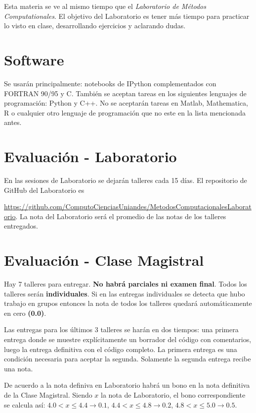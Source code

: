 \documentclass[11pt]{article}
\begin{document}
Esta materia se ve al mismo tiempo que el \emph{Laboratorio de M\'etodos
Computationales}. El objetivo del Laboratorio es tener m\'as tiempo
para practicar lo visto en clase, desarrollando ejercicios y aclarando dudas.

\section*{Software}
\noindent Se usar\'an principalmente: notebooks de IPython
complementados con FORTRAN 90/95 y C. Tambi\'en se aceptan tareas en los siguientes
lenguajes de programaci\'on: Python y C++. No se
aceptar\'an tareas en Matlab, Mathematica, R o cualquier otro lenguaje 
de programaci\'on que no este en la lista mencionada antes. 

\section*{Evaluaci\'on - Laboratorio}

En las sesiones de Laboratorio se dejar\'an talleres cada 15 d\'ias. El repositorio de GitHub del Laboratorio es

  \url{https://github.com/ComputoCienciasUniandes/MetodosComputacionalesLaboratorio}. La nota del Laboratorio será el promedio de las notas de los talleres entregados.

\section*{Evaluaci\'on - Clase Magistral}

Hay 7 talleres para entregar. \textbf{No habr\'a parciales ni
examen final}. Todos los talleres ser\'an \textbf{individuales}. 
Si en las entregas
individuales se detecta que hubo trabajo en grupos entonces la nota de
todos los talleres quedar\'a autom\'aticamente en cero
\textbf{(0.0)}.  

Las entregas para los \'ultimos 3 talleres se har\'an en dos tiempos:
una primera entrega donde se muestre expl\'icitamente un borrador del
c\'odigo con comentarios, luego la entrega definitiva con el c\'odigo
completo. La primera entrega es una condici\'on necesaria para aceptar
la segunda. Solamente la segunda entrega recibe una nota. 


De acuerdo a la
nota definiva en Laboratorio habr\'a un bono en la nota definitiva de
la Clase Magistral. Siendo $x$ la nota de Laboratorio, el bono correspondiente
se calcula as\'i:
$4.0 < x \leq 4.4 \rightarrow 0.1$, $4.4< x\leq 4.8\rightarrow 0.2$, $4.8<x
\leq 5.0\rightarrow 0.5$.
\end{document}
